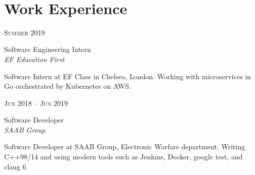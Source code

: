 \documentclass[10pt]{article} %
\begin{document}
\color{text1} %


\par{\\[1cm] %
	

\begin{minipage}[t]{0.5\textwidth} %
	

\section{Work Experience} 

{\raggedleft\textsc{Summer 2019}\par}

{\raggedright\large Software Engineering Intern\\ \textit{EF Education First}\\[5pt]}

    \normalsize{Software Intern at EF Class in Chelsea, London. Working with microservices in Go orchestrated by Kubernetes on AWS.}\\

{\raggedleft\textsc{Jun 2018 -- Jun 2019}\par}

{\raggedright\large Software Developer\\ \textit{SAAB Group}\\[5pt]}

    \normalsize{Software Developer at SAAB Group, Electronic Warfare department. Writing C++98/14 and using modern tools such as Jenkins, Docker, google test, and clang 6.}\\


\end{minipage}}
\end{document}
